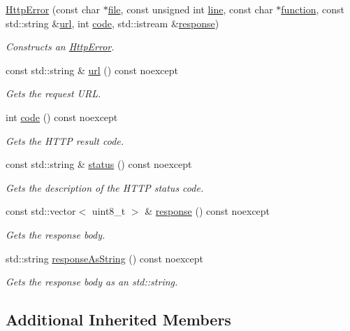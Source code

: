 \begin{DoxyCompactItemize}
\hyperlink{group___network_module_ga45854282cc688af939cbe7d7242661a3}{Http\+Error} (const char $\ast$\hyperlink{group___utility_module_ga0b75e32780cb8534179ff3c060739496}{file}, const unsigned int \hyperlink{group___utility_module_ga13437b5caffe754b7a32fc3c514907e5}{line}, const char $\ast$\hyperlink{group___utility_module_gaa69c98222c56544a9094154a8eab4db9}{function}, const std\+::string \&\hyperlink{group___network_module_ga979dcee6ab51c4f6be456ae242c8f90b}{url}, int \hyperlink{group___network_module_ga7dcace94fa3fc37b1f0f6881438c6446}{code}, std\+::istream \&\hyperlink{group___network_module_gac1cbcd7696b0048a61231953d2aad0d7}{response})
\begin{DoxyCompactList}\small\item\em Constructs an \hyperlink{classdg_1_1deepcore_1_1network_1_1_http_error}{Http\+Error}. \end{DoxyCompactList}\item 
const std\+::string \& \hyperlink{group___network_module_ga979dcee6ab51c4f6be456ae242c8f90b}{url} () const noexcept
\begin{DoxyCompactList}\small\item\em Gets the request U\+RL. \end{DoxyCompactList}\item 
int \hyperlink{group___network_module_ga7dcace94fa3fc37b1f0f6881438c6446}{code} () const noexcept
\begin{DoxyCompactList}\small\item\em Gets the H\+T\+TP result code. \end{DoxyCompactList}\item 
const std\+::string \& \hyperlink{group___network_module_gadaf5c8fe0e843d50fa5f55a83f6bb0d6}{status} () const noexcept
\begin{DoxyCompactList}\small\item\em Gets the description of the H\+T\+TP status code. \end{DoxyCompactList}\item 
const std\+::vector$<$ uint8\+\_\+t $>$ \& \hyperlink{group___network_module_gac1cbcd7696b0048a61231953d2aad0d7}{response} () const noexcept
\begin{DoxyCompactList}\small\item\em Gets the response body. \end{DoxyCompactList}\item 
std\+::string \hyperlink{group___network_module_ga0768820112e9c0d089a04b9d98bb5bf2}{response\+As\+String} () const noexcept
\begin{DoxyCompactList}\small\item\em Gets the response body as an std\+::string. \end{DoxyCompactList}\end{DoxyCompactItemize}
\subsection*{Additional Inherited Members}
